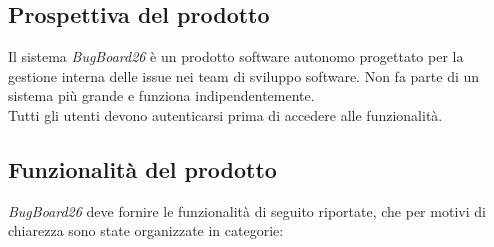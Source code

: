 \documentclass[a4paper,12pt]{article}
\begin{document}
\subsection{Prospettiva del prodotto}
Il sistema \textit{BugBoard26} è un prodotto software autonomo progettato per la gestione interna delle issue nei team di sviluppo software.
Non fa parte di un sistema più grande e funziona indipendentemente.\\
Tutti gli utenti devono autenticarsi prima di accedere alle funzionalità.

\subsection{Funzionalità del prodotto}
\textit{BugBoard26} deve fornire le funzionalità  di seguito riportate, che per motivi di chiarezza sono state organizzate in categorie:
\end{document}
